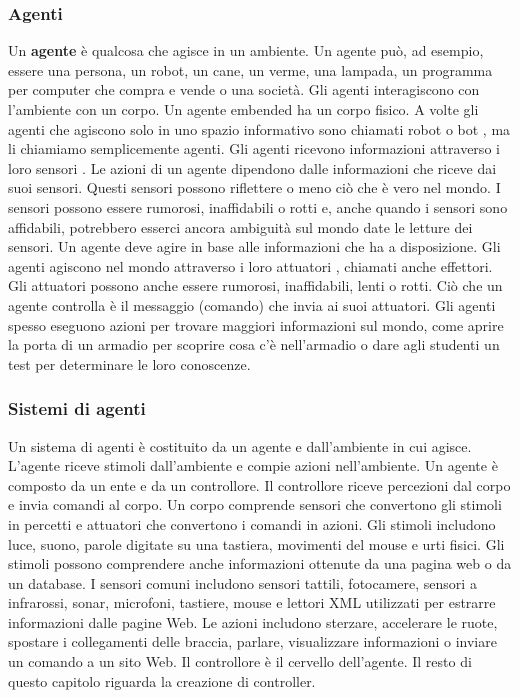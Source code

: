 \documentclass[a4paper]{extarticle}
\begin{document}
\subsubsection{Agenti}
Un \textbf{agente} è qualcosa che agisce in un ambiente. Un agente può, ad esempio, essere una persona, un robot, un cane, un verme, una lampada, un programma per computer che compra e vende o una società. Gli agenti interagiscono con l'ambiente con un corpo. Un agente embended ha un corpo fisico. A volte gli agenti che agiscono solo in uno spazio informativo sono chiamati robot o bot , ma li chiamiamo semplicemente agenti. Gli agenti ricevono informazioni attraverso i loro sensori . Le azioni di un agente dipendono dalle informazioni che riceve dai suoi sensori. Questi sensori possono riflettere o meno ciò che è vero nel mondo. I sensori possono essere rumorosi, inaffidabili o rotti e, anche quando i sensori sono affidabili, potrebbero esserci ancora ambiguità sul mondo date le letture dei sensori. Un agente deve agire in base alle informazioni che ha a disposizione. Gli agenti agiscono nel mondo attraverso i loro attuatori , chiamati anche effettori. Gli attuatori possono anche essere rumorosi, inaffidabili, lenti o rotti. Ciò che un agente controlla è il messaggio (comando) che invia ai suoi attuatori. Gli agenti spesso eseguono azioni per trovare maggiori informazioni sul mondo, come aprire la porta di un armadio per scoprire cosa c'è nell'armadio o dare agli studenti un test per determinare le loro conoscenze.

\subsubsection{Sistemi di agenti}
Un sistema di agenti è costituito da un agente e dall'ambiente in cui agisce. L'agente riceve stimoli dall'ambiente e compie azioni nell'ambiente. Un agente è composto da un ente e da un controllore. Il controllore riceve percezioni dal corpo e invia comandi al corpo. Un corpo comprende sensori che convertono gli stimoli in percetti e attuatori che convertono i comandi in azioni. Gli stimoli includono luce, suono, parole digitate su una tastiera, movimenti del mouse e urti fisici. Gli stimoli possono comprendere anche informazioni ottenute da una pagina web o da un database. I sensori comuni includono sensori tattili, fotocamere, sensori a infrarossi, sonar, microfoni, tastiere, mouse e lettori XML utilizzati per estrarre informazioni dalle pagine Web. Le azioni includono sterzare, accelerare le ruote, spostare i collegamenti delle braccia, parlare, visualizzare informazioni o inviare un comando a un sito Web. Il controllore è il cervello dell'agente. Il resto di questo capitolo riguarda la creazione di controller.
\end{document}
